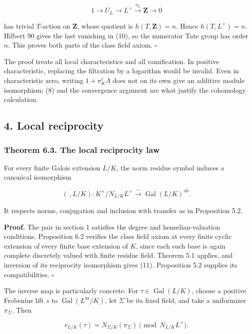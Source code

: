 \documentclass[11pt,a4paper]{article}
\begin{document}
\[
1\longrightarrow U_L\longrightarrow L^\times
\xrightarrow{v_L}\mathbf Z\longrightarrow0
\]

has trivial \(T\)-action on \(\mathbf Z\), whose quotient is
\(h(T,\mathbf Z)=n\). Hence \(h(T,L^\times)=n\). Hilbert 90 gives the
last vanishing in (10), so the numerator Tate group has order \(n\).
This proves both parts of the class field axiom. \(\square\)

The proof treats all local characteristics and all ramification. In
positive characteristic, replacing the filtration by a logarithm would
be invalid. Even in characteristic zero, writing \(1+\pi_K^r\Lambda\)
does not on its own give an additive module isomorphism; (8) and the
convergence argument are what justify the cohomology calculation.

\subsection{4. Local reciprocity}\label{local-reciprocity}

\subsubsection{Theorem 6.3. The local reciprocity
law}\label{theorem-6.3.-the-local-reciprocity-law}

For every finite Galois extension \(L/K\), the norm residue symbol
induces a canonical isomorphism

\[
(\ ,L/K):K^\times/N_{L/K}L^\times
\xrightarrow{\sim}\operatorname{Gal}(L/K)^{\mathrm{ab}}.
\tag{11}
\]

It respects norms, conjugation and inclusion with transfer as in
Proposition 5.2.

\textbf{Proof.} The pair in section 1 satisfies the degree and
henselian-valuation conditions. Proposition 6.2 verifies the class field
axiom at every finite cyclic extension of every finite base extension of
\(K\), since each such base is again complete discretely valued with
finite residue field. Theorem 5.1 applies, and inversion of its
reciprocity isomorphism gives (11). Proposition 5.2 supplies its
compatibilities. \(\square\)

The inverse map is particularly concrete. For
\(\tau\in\operatorname{Gal}(L/K)\), choose a positive Frobenius lift
\(s\) to \(\operatorname{Gal}(L^{\mathrm{ur}}/K)\), let \(\Sigma\) be
its fixed field, and take a uniformizer \(\pi_\Sigma\). Then

\[
r_{L/K}(\tau)=N_{\Sigma/K}(\pi_\Sigma)
\pmod{N_{L/K}L^\times}.
\]
\end{document}
